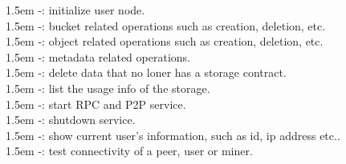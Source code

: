 \documentclass[10pt,a4paper]{article}
\begin{document}
\hangindent 1.5em
\noindent   
-: initialize user node.
  \vspace{-0.8em}
\\

\hangindent 1.5em
\noindent   
-: bucket related operations such as creation, deletion, etc.
  \vspace{-0.8em}
\\

\hangindent 1.5em
\noindent   
-: object related operations such as creation, deletion, etc.
  \vspace{-0.8em}
\\

\hangindent 1.5em
\noindent   
-: metadata related operations.
  \vspace{-0.8em}
\\

\hangindent 1.5em
\noindent   
-: delete data that no loner has a storage contract.
  \vspace{-0.8em}
\\

\hangindent 1.5em
\noindent   
-: list the usage info of the storage.
  \vspace{-0.8em}
\\

\hangindent 1.5em
\noindent   
-: start RPC and P2P service.
  \vspace{-0.8em}
\\

\hangindent 1.5em
\noindent   
-: shutdown service.
  \vspace{-0.8em}
\\

\hangindent 1.5em
\noindent   
-: show current user's information, such as id, ip address etc..
  \vspace{-0.8em}
\\

\hangindent 1.5em
\noindent   
-: test connectivity of a peer, user or miner.
  \vspace{-0.8em}
\\
\end{document}
